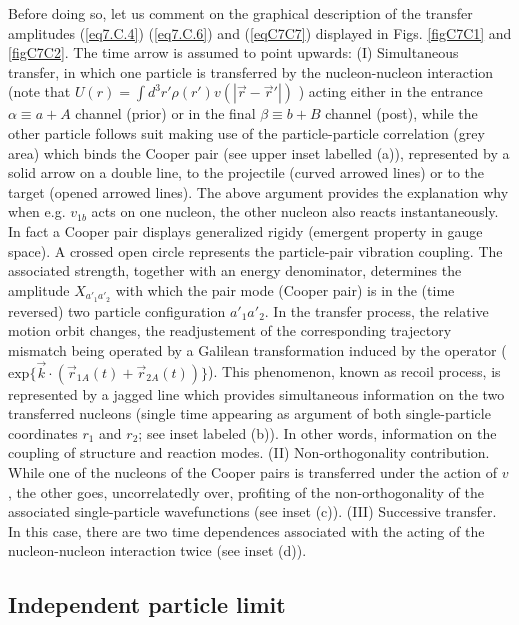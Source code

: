 \begin{subappendices}
Before doing so, let us comment on the graphical description of the transfer amplitudes (\ref{eq7.C.4}) (\ref{eq7.C.6}) and (\ref{eqC7C7}) displayed in Figs. \ref{figC7C1}
and \ref{figC7C2}. The time arrow is assumed to point upwards:
(I) Simultaneous transfer, in which one particle is transferred by the nucleon-nucleon interaction (note that $U(r)=\int d^3 r' \rho(r')v(|\vec r-\vec r'|)$ ) acting either in the entrance $\alpha \equiv a+A$ channel (prior) or in the final $\beta \equiv b + B$ channel (post), while the other particle follows suit making use of the particle-particle correlation (grey area) which binds the Cooper pair (see upper inset labelled (a)), represented by a solid arrow on a double line, to the projectile (curved arrowed lines) or to the target (opened arrowed lines). The above argument provides the explanation why when e.g. $v_{1b}$ acts on one nucleon, the other nucleon also reacts instantaneously. In fact a Cooper pair displays generalized rigidy (emergent property in gauge space).
A crossed open circle represents the particle-pair vibration coupling. The associated strength, together with an energy denominator, determines the amplitude $X_{a'_1 a'_2}$  with which the pair mode (Cooper pair) is in the (time reversed) two particle configuration $a'_1 a'_2$. In the transfer process, the  relative motion orbit changes, the readjustement of the corresponding trajectory mismatch being operated by a Galilean transformation induced by the operator ($\textrm{exp}\{ \vec k \cdot (\vec{r}_{1A}(t)+\vec{r}_{2A}(t))\}$). This phenomenon, known as recoil process, is represented by a jagged line which  provides simultaneous information on the two transferred nucleons (single time appearing as argument of both single-particle coordinates $r_1$ and $r_2$; see inset labeled (b)). In other words, information on the coupling of structure and reaction modes.
(II) Non-orthogonality contribution. While one of the nucleons of the Cooper pairs is transferred under the action of $v$, the other goes, uncorrelatedly over, profiting of the non-orthogonality of the associated single-particle wavefunctions (see inset (c)). 
(III) Successive transfer. In this case, there are two time dependences associated with the acting of the nucleon-nucleon interaction twice (see inset (d)). 


\subsection{Independent particle limit}\label{C7S7C1}


\end{subappendices}
